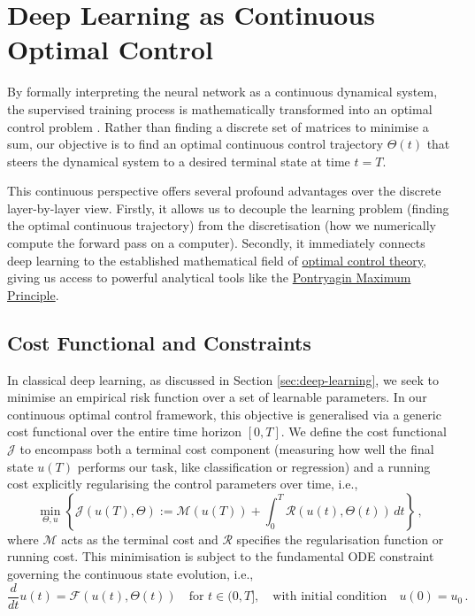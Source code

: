 \section{Deep Learning as Continuous Optimal Control}
\label{sec:optimal_control}

By formally interpreting the neural network as a continuous dynamical system, the supervised training process is mathematically transformed into an optimal control problem \cite{benning2019deep, e2017proposal}. Rather than finding a discrete set of matrices to minimise a sum, our objective is to find an optimal continuous control trajectory $\Theta(t)$ that steers the dynamical system to a desired terminal state at time $t=T$.

This continuous perspective offers several profound advantages over the discrete layer-by-layer view. Firstly, it allows us to decouple the learning problem (finding the optimal continuous trajectory) from the discretisation (how we numerically compute the forward pass on a computer). Secondly, it immediately connects deep learning to the established mathematical field of \href{https://en.wikipedia.org/wiki/Optimal_control}{optimal control theory}, giving us access to powerful analytical tools like the \href{https://en.wikipedia.org/wiki/Pontryagin%27s_maximum_principle}{Pontryagin Maximum Principle}.

\subsection{Cost Functional and Constraints}

In classical deep learning, as discussed in Section \ref{sec:deep-learning}, we seek to minimise an empirical risk function over a set of learnable parameters. In our continuous optimal control framework, this objective is generalised via a generic cost functional over the entire time horizon $[0, T]$. We define the cost functional $\mathcal{J}$ to encompass both a terminal cost component (measuring how well the final state $u(T)$ performs our task, like classification or regression) and a running cost explicitly regularising the control parameters over time, i.e.,
\begin{equation}
    \min_{\Theta, u} \left\{ \mathcal{J}(u(T), \Theta) := \mathcal{M}(u(T)) + \int_0^T \mathcal{R}(u(t), \Theta(t)) \, dt \right\} \, ,
    \label{eq:generic_cost_functional}
\end{equation}
where $\mathcal{M}$ acts as the terminal cost and $\mathcal{R}$ specifies the regularisation function or running cost. This minimisation is subject to the fundamental ODE constraint governing the continuous state evolution, i.e.,
\begin{equation*}
    \frac{d}{dt}u(t) = \mathcal{F}\left(u(t), \Theta(t)\right) \quad \text{for } t \in (0, T], \quad \text{with initial condition} \quad u(0) = u_0 \, .
\end{equation*}

